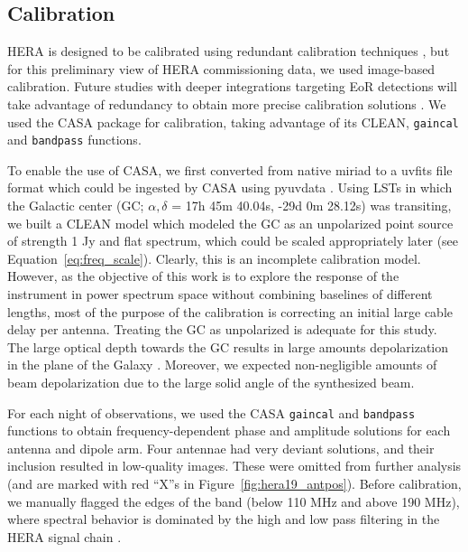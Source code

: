 \subsection{Calibration}
\label{subsec:hera19_cal}

HERA is designed to be calibrated using redundant calibration techniques \citep{Dillon.16}, but for this preliminary view of HERA commissioning data, we used image-based calibration. Future studies with deeper integrations targeting EoR detections will take advantage of redundancy to obtain more precise calibration solutions \citep{deBoer.17}. We used the {\sc CASA} \citep{casa} package for calibration, taking advantage of its CLEAN, {\tt gaincal} and {\tt bandpass} functions.

To enable the use of {\sc CASA}, we first converted from native {\sc miriad} to a {\sc uvfits} file format which could be ingested by {\sc CASA} using {\sc pyuvdata} \citep{pyuvdata}. 
Using LSTs in which the Galactic center (GC; $\alpha, \delta$ = 17h 45m 40.04s, -29d 0m 28.12s) was transiting, we built a CLEAN model which modeled the GC as an unpolarized point source of strength 1 Jy and flat spectrum, which could be scaled appropriately later (see Equation~\ref{eq:freq_scale}). 
Clearly, this is an incomplete calibration model. However, as the objective of this work is to explore the response of the instrument in power spectrum space without combining baselines of different lengths, most of the purpose of the calibration is correcting an initial large cable delay per antenna. 
Treating the GC as unpolarized is adequate for this study. The large optical depth towards the GC \citep{Oppermann.12} results in large amounts depolarization in the plane of the Galaxy \citep{Wolleben.06}. Moreover, we expected non-negligible amounts of beam depolarization due to the large solid angle of the synthesized beam.

For each night of observations, we used the {\sc CASA} {\tt gaincal} and {\tt bandpass} functions to obtain frequency-dependent phase and amplitude solutions for each antenna and dipole arm. Four antennae had very deviant solutions, and their inclusion resulted in low-quality images. These were omitted from further analysis (and are marked with red ``X''s in Figure~\ref{fig:hera19_antpos}).  Before calibration, we manually flagged the edges of the band (below 110 MHz and above 190 MHz), where spectral behavior is dominated by the high and low pass filtering in the HERA signal chain \citep{deBoer.17}.

